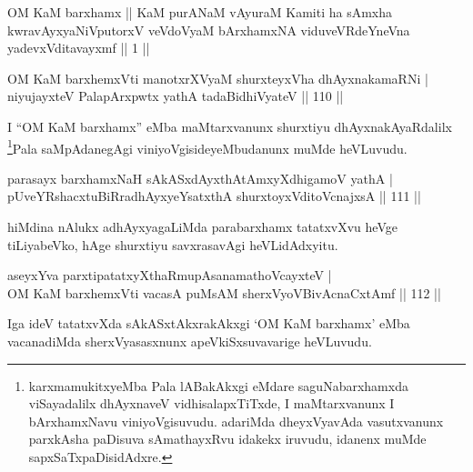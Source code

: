 \begin{kandikeshl}
OM KaM barxhamx || KaM purANaM vAyuraM Kamiti ha sAmxha kwravAyxyaNiVputorxV veVdoV\s yaM bArxhamxNA viduveVRdeYneVna yadevxVditavayxmf || 1 ||
\end{kandikeshl}

\centerline{}


\begin{shl}
OM KaM barxhemxVti manotxrXV\s yaM shurxteyxVha dhAyxnakamaRNi  | \\
niyujayxteV PalapArxpwtx yathA tadaBidhiVyateV \hfill||  110 ||  
\end{shl}

\begin{artha}
I ``OM KaM barxhamx'' eMba maMtarxvanunx shurxtiyu dhAyxnakAyaRdalilx \footnote{karxmamukitxyeMba Pala lABakAkxgi eMdare saguNabarxhamxda viSayadalilx dhAyxnaveV vidhisalapxTiTxde, I maMtarxvanunx I bArxhamxNavu viniyoVgisuvudu. adariMda dheyxVyavAda vasutxvanunx parxkAsha paDisuva sAmathayxRvu idakekx iruvudu, idanenx muMde sapxSaTxpaDisidAdxre.}Pala saMpAdanegAgi viniyoVgisideyeMbudanunx muMde heVLuvudu.
\end{artha}


\begin{shl}
parasayx barxhamxNaH sAkASxdAyxthAtAmxyXdhigamoV yathA  | \\
pUveYRshacxtuBiRradhAyxyeYsatxthA shurxtoyxVditoV\s cnajxsA \hfill||  111 ||  
\end{shl}

\begin{artha}
hiMdina nAlukx adhAyxyagaLiMda parabarxhamx tatatxvXvu heVge tiLiyabeVko, hAge shurxtiyu savxrasavAgi heVLidAdxyitu.
\end{artha}

\begin{shl}
aseyxYva parxtipatatxyXthaRmupAsanamathoVcayxteV  | \\
OM KaM barxhemxVti vacasA puMsAM sherxVyoVBivAcnaCxtAmf \hfill||  112 ||  
\end{shl}

\begin{artha}
Iga ideV tatatxvXda sAkASxtAkxrakAkxgi `OM KaM barxhamx' eMba vacanadiMda sherxVyasasxnunx apeVkiSxsuvavarige heVLuvudu.
\end{artha}

